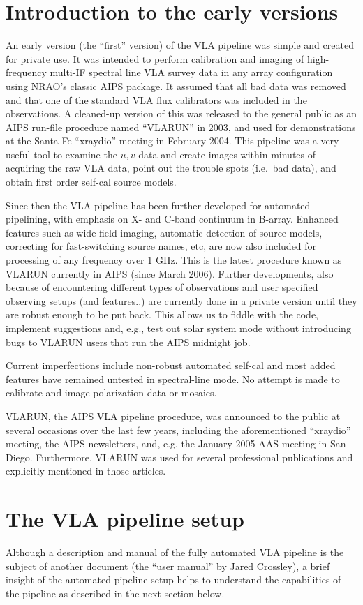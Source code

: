 \section{Introduction to the early versions}
An early version (the ``first'' version) of the VLA pipeline was
simple and created for private use. It was intended to perform
calibration and imaging of high-frequency multi-IF spectral line VLA
survey data in any array configuration using NRAO's classic AIPS
package. It assumed that all bad data was removed and that one of the
standard VLA flux calibrators was included in the observations. A
cleaned-up version of this was released to the general public as an
AIPS run-file procedure named ``VLARUN'' in 2003, and used for
demonstrations at the Santa Fe ``xraydio'' meeting in February
2004. This pipeline was a very useful tool to examine the $u,v$-data and
create images within minutes of acquiring the raw VLA data, point out
the trouble spots (i.e.\ bad data), and obtain first order self-cal
source models.

Since then the VLA pipeline has been further developed for automated
pipelining, with emphasis on X- and C-band continuum in
B-array. Enhanced features such as wide-field imaging, automatic
detection of source models, correcting for fast-switching source
names, etc, are now also
included for processing of any frequency over 1 GHz. This is the latest procedure known as VLARUN currently in
AIPS (since March 2006). Further developments, also because of encountering
different types of observations and user specified observing setups
(and features..) are currently done in a private version until they
are robust enough to be put back. This allows us to fiddle with the
code, implement suggestions and, e.g., test out solar system mode
without introducing bugs to VLARUN users that run the AIPS midnight
job.

Current imperfections include non-robust automated self-cal and most
added features have remained untested in spectral-line mode. No
attempt is made to calibrate and image polarization data or mosaics.

VLARUN, the AIPS VLA pipeline procedure, was announced to the public
at several occasions over the last few years, including the
aforementioned ``xraydio'' meeting, the AIPS newsletters, and, e.g,
the January 2005 AAS meeting in San Diego. Furthermore, VLARUN was
used for several professional publications and explicitly mentioned in
those articles.

\section{The VLA pipeline setup}
Although a description and manual of the fully automated VLA pipeline
is the subject of another document (the ``user manual'' by Jared
Crossley), a brief insight of the automated pipeline setup helps to
understand the capabilities of the pipeline as described in the next
section below.

